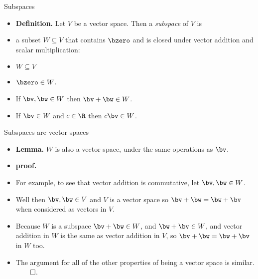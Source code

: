 \documentclass{beamer}
\begin{document}
\begin{frame}{Subspaces}

\begin{itemize}
\item \textbf{Definition.} Let $V$ be a vector space. Then a \emph{subspace}
of $V$ is
\item  a subset $W\subseteq V$ that contains $\bzero$ and is closed
under vector addition and scalar multiplication:
\item $W\subseteq V$
\item $\bzero \in W$.
\item If $\bv,\bw\in W$ then $\bv+\bw\in W$.
\item If $\bv\in W$ and $c\in \R$ then $c\bv\in W$.
\end{itemize}
\end{frame}

\begin{frame}{Subspaces are vector spaces}

\begin{itemize}
\item \textbf{Lemma.} $W$ is also a vector space, under the same operations
as $\bv$.
\item \textbf{proof.}
\item For example, to see that vector addition is commutative, let
$\bv,\bw\in W$.
\item Well then $\bv,\bw\in V$ and $V$ is a vector space so $\bv+\bw=\bw+\bv$
when considered as vectors in $V$.
\item Because $W$ is a subspace $\bv + \bw\in W$, and $\bw + \bv\in W$,
and vector addition in $W$ is the same as vector addition in $V$, so
$\bv+\bw=\bw+\bv$ in $W$ too.
\item The argument for all of the other properties of being a vector space
is similar. $\qed$.
\end{itemize}
\end{frame}
\end{document}

